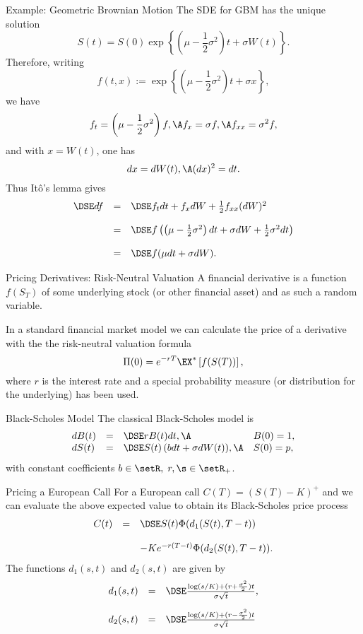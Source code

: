 Example: Geometric Brownian Motion
	The SDE for GBM has the unique solution
		$$
		S(t) = S(0) \exp \left\{\left(\mu - \frac{1}{2}\sigma^2\right)t +
		\sigma W(t) \right\}\!.
		$$
	Therefore, writing
		$$
		f(t,x) := \exp\left\{\left(\mu - \frac{1}{2}\sigma^2\right)t +
		\sigma x \right\}\!,
		$$
	we have
		$$
		f_t = \left(\mu - \frac{1}{2}\sigma^2\right)f, \A f_x = \sigma f,
		\A f_{xx} = \sigma^2 f,
		$$
	and with $x = W(t)$, one has
		$$
		dx = dW(t), \A (dx)^2 = dt.
		$$
	Thus It\^{o}'s lemma gives
		$$
		\begin{array}{lll}
		\DSE df &=&\DSE f_t dt + f_x dW + \frac{1}{2} f_{xx}
		(dW)^2\\*[12pt] &=&\DSE f\left(\left(\mu -
		\frac{1}{2}{\sigma}^2\right) dt + \sigma dW +
		\frac{1}{2}{\sigma}^2 dt\right)\\*[12pt] &=&\DSE f(\mu dt + \sigma
		dW).
		\end{array}
		$$


Pricing Derivatives: Risk-Neutral Valuation
	A financial derivative is a function $f(S_T)$ of some underlying stock (or other financial asset) and as such a random variable.
	
	In a standard financial market model we can calculate the price of a derivative with the the risk-neutral valuation formula
		$$
		\Pi(0) = e^{-rT}\EX^*\left[f(S(T))\right],
		$$
	where $r$ is the interest rate and a special probability measure (or distribution for the underlying) has been used.


Black-Scholes Model
The classical Black-Scholes model is
	$$
	\begin{array}{llll}
	dB(t) &=&\DSE r B(t) dt, \A &B(0)= 1,\\ dS(t) &=&\DSE S(t) \left(
	b dt + \sigma dW(t) \right)\!, \A &S(0) = p,
	\end{array}
	$$
with constant coefficients $b \in \setR,\; r,\s \in \setR_+$.


Pricing a European Call
For a European call $C(T) = (S(T)-K)^+$ and  we can evaluate the
above expected value to obtain its Black-Scholes price
pro\-cess
	$$
	\begin{array}{lll}
	C(t) &=&\DSE S(t) \Phi(d_1(S(t), T-t))\\*[12pt]
	&&- K e^{-r(T-t)} \Phi(d_2(S(t), T-t)).
	\end{array}
	$$
The functions $d_1(s,t)$ and $d_2(s,t)$ are given by
	$$
	\begin{array}{lll}
	d_1(s,t) &=&\DSE \frac{\log(s/K) + (r +
	\frac{\sigma^2}{2})t}{\sigma \sqrt{t}},\\*[12pt] d_2(s,t) &=&\DSE
	 \frac{\log(s/K) + (r -
	\frac{\sigma^2}{2})t}{\sigma \sqrt{t}}
	\end{array}
	$$


